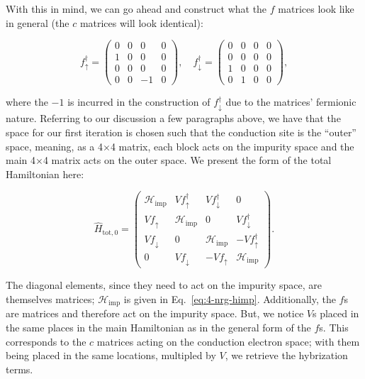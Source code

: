 With this in mind, we can go ahead and construct what the $f$ matrices look like in general (the $c$ matrices will look identical):

\begin{equation}
  f^\dagger_\uparrow = \begin{pmatrix}0 & 0 & 0 & 0 \\ 1 & 0 & 0 & 0 \\ 0 & 0 & 0 & 0 \\ 0 & 0 & -1 & 0\end{pmatrix},\quad f^\dagger_\downarrow = \begin{pmatrix}0 & 0 & 0 & 0 \\ 0 & 0 & 0 & 0 \\ 1 & 0 & 0 & 0 \\ 0 & 1 & 0 & 0\end{pmatrix},
\end{equation}

where the $-1$ is incurred in the construction of $f^\dagger_\downarrow$ due to the matrices' fermionic nature. Referring to our discussion a few paragraphs above, we have that the space for our first iteration is chosen such that the conduction site is the ``outer'' space, meaning, as a 4$\times$4 matrix, each block acts on the impurity space and the main 4$\times$4 matrix acts on the outer space. We present the form of the total Hamiltonian here:

\begin{equation}
  \hat{H}_{\mathrm{tot},0} =
  \begin{pmatrix}
    \mathcal{H}_{\mathrm{imp}} & Vf^\dagger_\uparrow & Vf^\dagger_\downarrow & 0 \\
    Vf_\uparrow & \mathcal{H}_{\mathrm{imp}} & 0 & Vf^\dagger_\downarrow \\
    Vf_\downarrow & 0 & \mathcal{H}_{\mathrm{imp}} & -Vf^\dagger_\uparrow \\
    0 & Vf_\downarrow & -Vf_\uparrow & \mathcal{H}_{\mathrm{imp}}
  \end{pmatrix}.
  \label{eq:4-nrg-htot0}
\end{equation}

The diagonal elements, since they need to act on the impurity space, are themselves matrices; $\mathcal{H}_{\mathrm{imp}}$ is given in Eq.~\eqref{eq:4-nrg-himp}. Additionally, the $f$s are matrices and therefore act on the impurity space. But, we notice $V$s placed in the same places in the main Hamiltonian as in the general form of the $f$s. This corresponds to the $c$ matrices acting on the conduction electron space; with them being placed in the same locations, multipled by $V$, we retrieve the hybrization terms.

